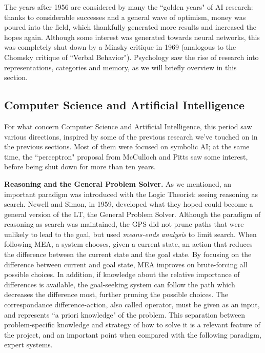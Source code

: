 \documentclass[../main.tex]{subfiles}
\begin{document}
The years after 1956 are considered by many the ``golden years" of AI research: thanks to considerable successes and a general wave of optimism, money was poured into the field, which thankfully generated more results and increased the hopes again. Although some interest was generated towards neural networks, this was completely shut down by a Minsky critique in 1969 (analogous to the Chomsky critique of ``Verbal Behavior"). Psychology saw the rise of research into representations, categories and memory, as we will briefly overview in this section.

\subsection{Computer Science and Artificial Intelligence}
For what concern Computer Science and Artificial Intelligence, this period saw various directions, inspired by some of the previous research we've touched on in the previous sections. Most of them were focused on symbolic AI; at the same time, the ``perceptron" proposal from McCulloch and Pitts saw some interest, before being shut down for more than ten years.

\vspace{4pt}
\textbf{Reasoning and the General Problem Solver.}
As we mentioned, an important paradigm was introduced with the Logic Theorist: seeing reasoning as search. Newell and Simon, in 1959, developed what they hoped could become a general version of the LT, the General Problem Solver. Although the paradigm of reasoning as search was maintained, the GPS did not prune paths that were unlikely to lead to the goal, but used \textit{means-ends analysis} to limit search. When following MEA, a system chooses, given a current state, an action that reduces the difference between the current state and the goal state. By focusing on the difference between current and goal state, MEA improves on brute-forcing all possible choices. In addition, if knowledge about the relative importance of differences is available, the goal-seeking system can follow the path which decreases the difference most, further pruning the possible choices. The correspondance difference-action, also called operator, must be given as an input, and represents ``a priori knowledge" of the problem. This separation between problem-specific knowledge and strategy of how to solve it is a relevant feature of the project, and an important point when compared with the following paradigm, expert systems.
\end{document}
